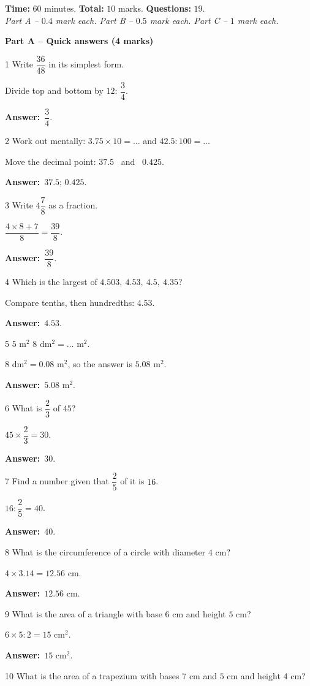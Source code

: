 \documentclass[11pt]{article}
\newif\ifsol \solfalse
\providecommand{\AnsWord}{Đáp số}
\newcommand{\dapso}[1]{\par\textbf{\AnsWord:}\ #1}
\newcommand{\probsol}[1]{%
  \begin{lrbox}{\solmeasure}\begin{minipage}{\dimexpr\linewidth-24pt\relax}#1\end{minipage}\end{lrbox}%
  \ifsol
    \begin{solbox}#1\end{solbox}%
  \else
    \setlength{\solht}{\dimexpr\ht\solmeasure+\dp\solmeasure+0.85cm\relax}%
    \ifdim\solht<1.35cm\setlength{\solht}{1.35cm}\fi
    \begin{tcolorbox}[colback=white,colframe=Line,boxrule=0.8pt,arc=5pt,
      left=8pt,right=8pt,top=4pt,bottom=4pt,height=\solht]{\footnotesize\color{Slate}\itshape\WorkWord}\end{tcolorbox}%
  \fi}
\newcommand{\dividerbar}[1]{\par\vspace{0.6em}\noindent
  \begin{tcolorbox}[enhanced,frame hidden,interior hidden,borderline west={5pt}{0pt}{ProbBlue},
    colback=white,left=12pt,right=12pt,top=5pt,bottom=5pt,arc=4pt]
  {\large\bfseries\color{ProbBlue} #1}\end{tcolorbox}\vspace{0.4em}}
\newcommand{\gap}{\vspace{0.3cm}}
\def\WorkWord{Your work:}
\def\AnsWord{Answer}
\begin{document}
\begin{knowbox}
\textbf{Time:} $60$ minutes. \quad \textbf{Total:} $10$ marks. \quad \textbf{Questions:} $19$.\\[2pt]\emph{Part A -- $0.4$ mark each. \quad Part B -- $0.5$ mark each. \quad Part C -- $1$ mark each.}
\end{knowbox}
\gap
\dividerbar{Part A -- Quick answers (4 marks)}
\begin{probbox}{1}{\relax}
Write $\dfrac{36}{48}$ in its simplest form.
\end{probbox}
\probsol{
Divide top and bottom by $12$: $\dfrac34$.
\dapso{$\dfrac34$.}}
\gap
\begin{probbox}{2}{\relax}
Work out mentally: $3.75\times10=\ldots$ \quad and \quad $42.5:100=\ldots$
\end{probbox}
\probsol{
Move the decimal point: $37.5$ \ and \ $0.425$.
\dapso{$37.5$; $0.425$.}}
\gap
\begin{probbox}{3}{\relax}
Write $4\dfrac78$ as a fraction.
\end{probbox}
\probsol{
$\dfrac{4\times8+7}8=\dfrac{39}8$.
\dapso{$\dfrac{39}8$.}}
\gap
\begin{probbox}{4}{\relax}
Which is the largest of $4.503,\ 4.53,\ 4.5,\ 4.35$?
\end{probbox}
\probsol{
Compare tenths, then hundredths: $4.53$.
\dapso{$4.53$.}}
\gap
\begin{probbox}{5}{\relax}
$5$ m$^2$ $8$ dm$^2=\ldots$ m$^2$.
\end{probbox}
\probsol{
$8$ dm$^2=0.08$ m$^2$, so the answer is $5.08$ m$^2$.
\dapso{$5.08$ m$^2$.}}
\gap
\begin{probbox}{6}{\relax}
What is $\dfrac23$ of $45$?
\end{probbox}
\probsol{
$45\times\dfrac23=30$.
\dapso{$30$.}}
\gap
\begin{probbox}{7}{\relax}
Find a number given that $\dfrac25$ of it is $16$.
\end{probbox}
\probsol{
$16:\dfrac25=40$.
\dapso{$40$.}}
\gap
\begin{probbox}{8}{\relax}
What is the circumference of a circle with diameter $4$ cm?
\end{probbox}
\probsol{
$4\times3.14=12.56$ cm.
\dapso{$12.56$ cm.}}
\gap
\begin{probbox}{9}{\relax}
What is the area of a triangle with base $6$ cm and height $5$ cm?
\end{probbox}
\probsol{
$6\times5:2=15$ cm$^2$.
\dapso{$15$ cm$^2$.}}
\gap
\begin{probbox}{10}{\relax}
What is the area of a trapezium with bases $7$ cm and $5$ cm and height $4$ cm?
\end{probbox}
\end{document}
